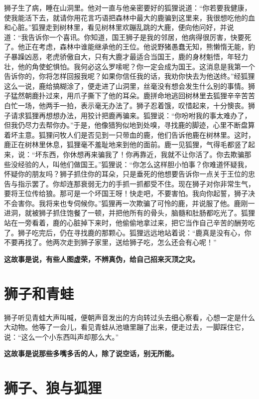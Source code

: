 狮子生了病，睡在山洞里。他对一直与他亲密要好的狐狸说道：“你若要我健康，使我能活下去，就请你用花言巧语把森林中最大的鹿骗到这里来，我很想吃他的血和心脏。”狐狸走到树林里，看见树林里欢蹦乱跳的大鹿，便向他问好，并说道：“我告诉你一个喜讯。你知道，国王狮子是我的邻居，他病得很厉害，快要死了。他正在考虑，森林中谁能继承他的王位。他说野猪愚蠢无知，熊懒惰无能，豹子暴躁凶恶，老虎骄傲自大，只有大鹿才最适合当国王，鹿的身材魁悟，年轻力壮，他的角使蛇惧怕。我何必这么罗嗦呢？你一定会成为国王。这消息是我第一个告诉你的，你将怎样回报我呢？如果你信任我的话，我劝你快去为他送终。”经狐狸这么一说，鹿给搞糊涂了，便走进了山洞里，丝毫没有想会发生什么别的事情。狮子猛然朝鹿扑过来，用爪子撕下了他的耳朵。鹿拼命地逃回树林里去狐狸辛辛苦苦白忙一场，他两手一拍，表示毫无办法了。狮子忍着饿，叹惜起来，十分懊丧。狮子请求狐狸再想想办法，用狡计把鹿再骗来。狐狸说：“你吩咐我的事太难办了，但我仍尽力去帮你办。”于是，他像猎狗似地到处嗅，寻找鹿的脚迹，心里不断盘算着坏主意。狐狸问牧人们是否见到一只带血的鹿，他们告诉他鹿在树林里。这时，鹿正在树林里休息，狐狸毫不羞耻地来到他的面前。鹿一见狐狸，气得毛都竖了起来，说：“坏东西，你休想再来骗我了！你再靠近，我就不让你活了。你去欺骗那些没经验的人，叫他们做国王。”狐狸说：“你怎么这样胆小怕事？你难道怀疑我，怀疑你的朋友吗？狮子抓住你的耳朵，只是垂死的他想要告诉你一点关于王位的忠告与指示罢了。你却连那衰弱无力的手抓一抓都受不住。现在狮子对你非常生气，要将王位传给狼。那可是一个坏国王呀！快走吧，不要害怕。我向你起誓，狮子决不会害你。我将来也专伺候你。”狐狸再一次欺骗了可怜的鹿，并说服了他。鹿刚一进洞，就被狮子抓住饱餐了一顿，并把他所有的骨头，脑髓和肚肠都吃光了。狐狸站在一旁看着，鹿的心脏掉下来时，他偷偷地拿过来，把它当作自己辛苦的酬劳吃了。狮子吃完后，仍在寻找鹿的那颗心。狐狸远远地站着说：“鹿真是没有心，你不要再找了。他两次走到狮子家里，送给狮子吃，怎么还会有心呢！”

{\bfseries \color{red}这故事是说，有些人图虚荣，不辨真伪，给自己招来灭顶之灾。}

\section{狮子和青蛙}

狮子听见青蛙大声叫喊，便朝声音发出的方向转过头去细心察看，心想一定是什么大动物。他等了一会儿，看见青蛙从池塘里蹦了出来，便走过去，一脚踩住它，说：“这么一个小东西叫声却那么大。”

{\bfseries \color{red}这故事是说那些多嘴多舌的人，除了说空话，别无所能。}

\section{狮子、狼与狐狸}

